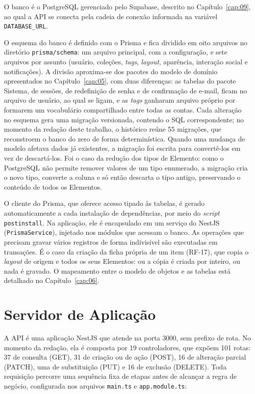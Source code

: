 O banco é o PostgreSQL gerenciado pelo Supabase, descrito no Capítulo~\ref{cap:09}, ao qual a API se conecta pela cadeia de conexão informada na variável \texttt{DATABASE\_URL}.

O esquema do banco é definido com o Prisma e fica dividido em oito arquivos no diretório \texttt{prisma/schema}: um arquivo principal, com a configuração, e sete arquivos por assunto (usuário, coleções, \textit{tags}, \textit{layout}, aparência, interação social e notificações). A divisão aproxima-se dos pacotes do modelo de domínio apresentados no Capítulo~\ref{cap:05}, com duas diferenças: as tabelas do pacote Sistema, de sessões, de redefinição de senha e de confirmação de e-mail, ficam no arquivo de usuário, ao qual se ligam, e as \textit{tags} ganharam arquivo próprio por formarem um vocabulário compartilhado entre todas as contas. Cada alteração no esquema gera uma migração versionada, contendo o SQL correspondente; no momento da redação deste trabalho, o histórico reúne 55 migrações, que reconstroem o banco do zero de forma determinística. Quando uma mudança de modelo afetava dados já existentes, a migração foi escrita para convertê-los em vez de descartá-los. Foi o caso da redução dos tipos de Elemento: como o PostgreSQL não permite remover valores de um tipo enumerado, a migração cria o novo tipo, converte a coluna e só então descarta o tipo antigo, preservando o conteúdo de todos os Elementos.

O cliente do Prisma, que oferece acesso tipado às tabelas, é gerado automaticamente a cada instalação de dependências, por meio do \textit{script} \texttt{postinstall}. Na aplicação, ele é encapsulado em um serviço do NestJS (\texttt{PrismaService}), injetado nos módulos que acessam o banco. As operações que precisam gravar vários registros de forma indivisível são executadas em transações. É o caso da criação da ficha própria de um item (RF-17), que copia o \textit{layout} de origem e todos os seus Elementos: ou a cópia é criada por inteiro, ou nada é gravado. O mapeamento entre o modelo de objetos e as tabelas está detalhado no Capítulo~\ref{cap:06}.

\section{Servidor de Aplicação}
\label{sec:servidorAplicacao}

A API é uma aplicação NestJS que atende na porta 3000, sem prefixo de rota. No momento da redação, ela é composta por 19 controladores, que expõem 101 rotas: 37 de consulta (GET), 31 de criação ou de ação (POST), 16 de alteração parcial (PATCH), uma de substituição (PUT) e 16 de exclusão (DELETE). Toda requisição percorre uma sequência fixa de etapas antes de alcançar a regra de negócio, configurada nos arquivos \texttt{main.ts} e \texttt{app.module.ts}:

